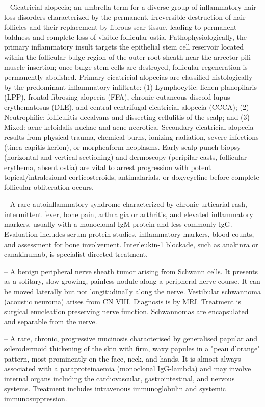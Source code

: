 -- Cicatricial alopecia; an umbrella term for a diverse group of inflammatory hair-loss disorders characterized by the permanent, irreversible destruction of hair follicles and their replacement by fibrous scar tissue, leading to permanent baldness and complete loss of visible follicular ostia. Pathophysiologically, the primary inflammatory insult targets the epithelial stem cell reservoir located within the follicular bulge region of the outer root sheath near the arrector pili muscle insertion; once bulge stem cells are destroyed, follicular regeneration is permanently abolished. Primary cicatricial alopecias are classified histologically by the predominant inflammatory infiltrate: (1) Lymphocytic: lichen planopilaris (LPP), frontal fibrosing alopecia (FFA), chronic cutaneous discoid lupus erythematosus (DLE), and central centrifugal cicatricial alopecia (CCCA); (2) Neutrophilic: folliculitis decalvans and dissecting cellulitis of the scalp; and (3) Mixed: acne keloidalis nuchae and acne necrotica. Secondary cicatricial alopecia results from physical trauma, chemical burns, ionizing radiation, severe infections (tinea capitis kerion), or morpheaform neoplasms. Early scalp punch biopsy (horizontal and vertical sectioning) and dermoscopy (peripilar casts, follicular erythema, absent ostia) are vital to arrest progression with potent topical/intralesional corticosteroids, antimalarials, or doxycycline before complete follicular obliteration occurs.

-- A rare autoinflammatory syndrome characterized by chronic urticarial rash, intermittent fever, bone pain, arthralgia or arthritis, and elevated inflammatory markers, usually with a monoclonal IgM protein and less commonly IgG. Evaluation includes serum protein studies, inflammatory markers, blood counts, and assessment for bone involvement. Interleukin-1 blockade, such as anakinra or canakinumab, is specialist-directed treatment.

-- A benign peripheral nerve sheath tumor arising from Schwann cells. It presents as a solitary, slow-growing, painless nodule along a peripheral nerve course. It can be moved laterally but not longitudinally along the nerve. Vestibular schwannoma (acoustic neuroma) arises from CN VIII. Diagnosis is by MRI. Treatment is surgical enucleation preserving nerve function. Schwannomas are encapsulated and separable from the nerve.

-- A rare, chronic, progressive mucinosis characterised by generalised papular and sclerodermoid thickening of the skin with firm, waxy papules in a "peau d'orange" pattern, most prominently on the face, neck, and hands. It is almost always associated with a paraproteinaemia (monoclonal IgG-lambda) and may involve internal organs including the cardiovascular, gastrointestinal, and nervous systems. Treatment includes intravenous immunoglobulin and systemic immunosuppression.

